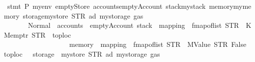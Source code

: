 \begin{isabellebody}
\isanewline
\isanewline
{}\isamarkupfalse%
\ {\isacartoucheopen}{\isacharparenleft}{\kern0pt}stmt\ P{}\ myenv\ emptyStore\ {\isasymlparr}accounts{\isacharequal}{\kern0pt}emptyAccount{\isacharcomma}{\kern0pt}\ stack{\isacharequal}{\kern0pt}mystack{\isacharcomma}{\kern0pt}\ memory{\isacharequal}{\kern0pt}mymemory{\isacharcomma}{\kern0pt}\ storage{\isacharequal}{\kern0pt}{\isacharparenleft}{\kern0pt}mystore\ {\isacharparenleft}{\kern0pt}{\isacharparenleft}{\kern0pt}STR\ {\isacharprime}{\kern0pt}{\isacharprime}{\kern0pt}ad{\isacharprime}{\kern0pt}{\isacharprime}{\kern0pt}{\isacharparenright}{\kern0pt}{\isacharcolon}{\kern0pt}{\isacharequal}{\kern0pt}\ mystorage{\isacharparenright}{\kern0pt}{\isacharparenright}{\kern0pt}{\isacharcomma}{\kern0pt}\ gas{\isacharequal}{\kern0pt}{}{}{}{}{\isasymrparr}{\isacharparenright}{\kern0pt}\isanewline
\ \ \ \ \ \ {\isacharequal}{\kern0pt}\ Normal\ {\isacharparenleft}{\kern0pt}{\isacharparenleft}{\kern0pt}{\isacharparenright}{\kern0pt}{\isacharcomma}{\kern0pt}\ {\isasymlparr}accounts\ {\isacharequal}{\kern0pt}\ emptyAccount{\isacharcomma}{\kern0pt}\ stack\ {\isacharequal}{\kern0pt}\ {\isasymlparr}mapping\ {\isacharequal}{\kern0pt}\ fmap{\isacharunderscore}{\kern0pt}of{\isacharunderscore}{\kern0pt}list\ {\isacharbrackleft}{\kern0pt}{\isacharparenleft}{\kern0pt}STR\ {\isacharprime}{\kern0pt}{\isacharprime}{\kern0pt}{}{\isacharprime}{\kern0pt}{\isacharprime}{\kern0pt}{\isacharcomma}{\kern0pt}\ KMemptr\ STR\ {\isacharprime}{\kern0pt}{\isacharprime}{\kern0pt}{}{\isacharprime}{\kern0pt}{\isacharprime}{\kern0pt}{\isacharparenright}{\kern0pt}{\isacharbrackright}{\kern0pt}{\isacharcomma}{\kern0pt}\ toploc\ {\isacharequal}{\kern0pt}\ {}{\isasymrparr}{\isacharcomma}{\kern0pt}\isanewline
\ \ \ \ \ \ \ \ \ \ \ \ \ \ \ \ \ \ \ memory\ {\isacharequal}{\kern0pt}\ {\isasymlparr}mapping\ {\isacharequal}{\kern0pt}\ fmap{\isacharunderscore}{\kern0pt}of{\isacharunderscore}{\kern0pt}list\ {\isacharbrackleft}{\kern0pt}{\isacharparenleft}{\kern0pt}STR\ {\isacharprime}{\kern0pt}{\isacharprime}{\kern0pt}{}{\isachardot}{\kern0pt}{}{\isacharprime}{\kern0pt}{\isacharprime}{\kern0pt}{\isacharcomma}{\kern0pt}\ MValue\ STR\ {\isacharprime}{\kern0pt}{\isacharprime}{\kern0pt}False{\isacharprime}{\kern0pt}{\isacharprime}{\kern0pt}{\isacharparenright}{\kern0pt}{\isacharbrackright}{\kern0pt}{\isacharcomma}{\kern0pt}\ toploc\ {\isacharequal}{\kern0pt}\ {}{\isasymrparr}{\isacharcomma}{\kern0pt}\ storage\ {\isacharequal}{\kern0pt}\ {\isacharparenleft}{\kern0pt}mystore\ {\isacharparenleft}{\kern0pt}{\isacharparenleft}{\kern0pt}STR\ {\isacharprime}{\kern0pt}{\isacharprime}{\kern0pt}ad{\isacharprime}{\kern0pt}{\isacharprime}{\kern0pt}{\isacharparenright}{\kern0pt}{\isacharcolon}{\kern0pt}{\isacharequal}{\kern0pt}\ mystorage{\isacharparenright}{\kern0pt}{\isacharparenright}{\kern0pt}{\isacharcomma}{\kern0pt}\ gas\ {\isacharequal}{\kern0pt}\ {}{}{}{}{\isasymrparr}{\isacharparenright}{\kern0pt}\ {\isacartoucheclose}\ \ \isanewline

\end{isabellebody}
